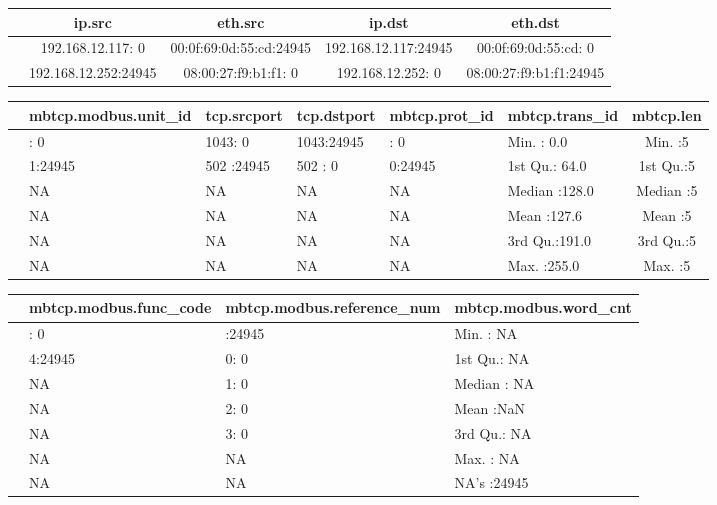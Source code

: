 \documentclass[12pt,]{article}
\begin{document}
\begin{longtable}[c]{@{}lcccc@{}}
\toprule
& ip.src & eth.src & ip.dst & eth.dst\tabularnewline
\midrule
\endhead
& 192.168.12.117: 0 & 00:0f:69:0d:55:cd:24945 & 192.168.12.117:24945 &
00:0f:69:0d:55:cd: 0\tabularnewline
& 192.168.12.252:24945 & 08:00:27:f9:b1:f1: 0 & 192.168.12.252: 0 &
08:00:27:f9:b1:f1:24945\tabularnewline
\bottomrule
\end{longtable}

\begin{longtable}[c]{@{}llllllc@{}}
\toprule
& mbtcp.modbus.unit\_id & tcp.srcport & tcp.dstport & mbtcp.prot\_id &
mbtcp.trans\_id & mbtcp.len\tabularnewline
\midrule
\endhead
& : 0 & 1043: 0 & 1043:24945 & : 0 & Min. : 0.0 & Min. :5\tabularnewline
& 1:24945 & 502 :24945 & 502 : 0 & 0:24945 & 1st Qu.: 64.0 & 1st
Qu.:5\tabularnewline
& NA & NA & NA & NA & Median :128.0 & Median :5\tabularnewline
& NA & NA & NA & NA & Mean :127.6 & Mean :5\tabularnewline
& NA & NA & NA & NA & 3rd Qu.:191.0 & 3rd Qu.:5\tabularnewline
& NA & NA & NA & NA & Max. :255.0 & Max. :5\tabularnewline
\bottomrule
\end{longtable}

\begin{longtable}[c]{@{}llll@{}}
\toprule
& mbtcp.modbus.func\_code & mbtcp.modbus.reference\_num &
mbtcp.modbus.word\_cnt\tabularnewline
\midrule
\endhead
& : 0 & :24945 & Min. : NA\tabularnewline
& 4:24945 & 0: 0 & 1st Qu.: NA\tabularnewline
& NA & 1: 0 & Median : NA\tabularnewline
& NA & 2: 0 & Mean :NaN\tabularnewline
& NA & 3: 0 & 3rd Qu.: NA\tabularnewline
& NA & NA & Max. : NA\tabularnewline
& NA & NA & NA's :24945\tabularnewline
\bottomrule
\end{longtable}
\end{document}
